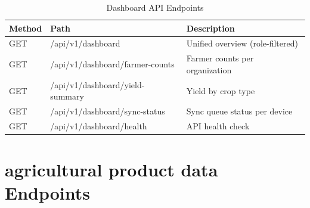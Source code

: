 \begin{longtable}{lll}
\caption{Dashboard API Endpoints}
\label{tab:dashboard-api} \\
\toprule
\textbf{Method} & \textbf{Path} & \textbf{Description} \\
\midrule
\endhead
\midrule
\endfoot
\bottomrule
\endlastfoot
GET & /api/v1/dashboard & Unified overview (role-filtered) \\
GET & /api/v1/dashboard/farmer-counts & Farmer counts per organization \\
GET & /api/v1/dashboard/yield-summary & Yield by crop type \\
GET & /api/v1/dashboard/sync-status & Sync queue status per device \\
GET & /api/v1/dashboard/health & API health check \\
\end{longtable}

\section{agricultural product data Endpoints}

